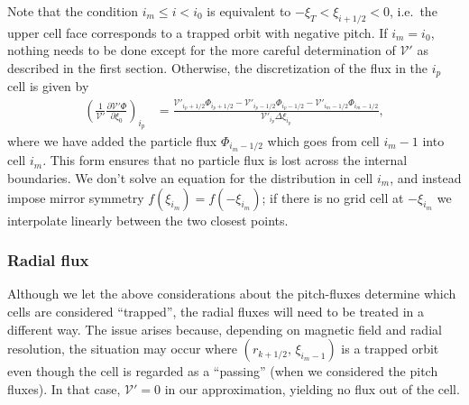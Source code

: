 \documentclass[11pt,a4paper]{article}
\newcommand{\Vp}{\ensuremath{\mathcal{V}'} }
\begin{document}
Note that the condition $i_m \leq i < i_0$ is equivalent to $- \xi_T < \xi_{i+1/2} < 0$, i.e.~the upper cell face corresponds to a trapped orbit with negative pitch.
If $i_m=i_0$, nothing needs to be done except for the more careful determination of \Vp\! as described in the first section. Otherwise, the discretization of the flux in the $i_p$ cell is given by
\begin{align}
\left(\frac{1}{\mathcal{V}'}\frac{\partial \mathcal{V}' \Phi}{\partial \xi_0} \right)_{i_p} &=  \frac{\mathcal{V}'_{i_p+1/2}\Phi_{i_p+1/2} - \mathcal{V}'_{i_p-1/2}\Phi_{i_p-1/2} - \mathcal{V}'_{i_m-1/2}\Phi_{i_m-1/2}}{\mathcal{V}'_{i_p} \Delta \xi_{i_p}}, %
\end{align}
where we have added the particle flux $\Phi_{i_m-1/2}$ which goes from cell $i_m-1$ into cell $i_m$. This form ensures that no particle flux is lost across the internal boundaries.
We don't solve an equation for the distribution in cell $i_m$, and instead impose mirror symmetry $f(\xi_{i_m}) = f(-\xi_{i_m})$; if there is no grid cell at $-\xi_{i_m}$ we interpolate linearly between the two closest points.

\subsubsection*{Radial flux}
Although we let the above considerations about the pitch-fluxes determine which cells are considered ``trapped'', the radial fluxes will need to be treated in a different way. The issue arises because, depending on magnetic field and radial resolution, the situation may occur where $(r_{k+1/2},\,\xi_{i_m-1})$ is a trapped orbit even though the cell is regarded as a ``passing'' (when we considered the pitch fluxes). In that case, $\mathcal{V}'=0$ in our approximation, yielding no flux out of the cell.
\end{document}
